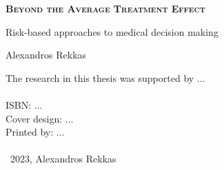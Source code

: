 


\clearpage\null\pagestyle{empty}
\newpage


\pagestyle{empty}

\def\drop{.1\textheight}

\vspace*{6cm}
\begin{center}
\Large \textbf{\textsc{Beyond the Average Treatment Effect}}\par
\Large Risk-based approaches to medical decision making \par

\vspace*{1.8cm}

\Large Alexandros Rekkas

\end{center}

\clearpage

\thispagestyle{empty}
\vspace*{13cm}

\begingroup %
\small
\setlength{\parskip}{\baselineskip} %
\setlength\parindent{0pt} %
The research in this thesis was supported by ...\\
\\
ISBN: ... \\
Cover design: ...\\
Printed by: ...\\
\\
\textcopyright\ 2023, Alexandros Rekkas

\endgroup

\newpage
\thispagestyle{empty}

